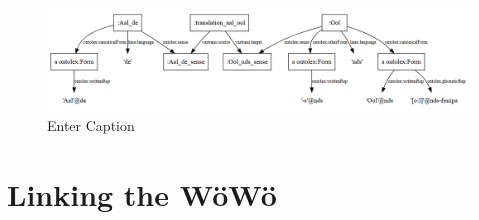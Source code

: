 \documentclass[11pt]{article}
\begin{document}
\begin{enumerate}
\begin{figure}
    \centering
    \includegraphics[width=1\linewidth]{aal-rdf-graph.png}
    \caption{Enter Caption}
    \label{fig:enter-label}
\end{figure}

%
%
%

\section{Linking the WöWö}


\end{enumerate}
\end{document}
